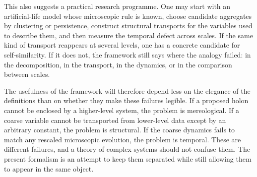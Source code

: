 \documentclass[runningheads]{llncs}
\begin{document}
This also suggests a practical research programme. One may start with an artificial-life model whose microscopic rule is known, choose candidate aggregates by clustering or persistence, construct structural transports for the variables used to describe them, and then measure the temporal defect across scales. If the same kind of transport reappears at several levels, one has a concrete candidate for self-similarity. If it does not, the framework still says where the analogy failed: in the decomposition, in the transport, in the dynamics, or in the comparison between scales.

The usefulness of the framework will therefore depend less on the elegance of the definitions than on whether they make these failures legible. If a proposed holon cannot be enclosed by a higher-level system, the problem is mereological. If a coarse variable cannot be transported from lower-level data except by an arbitrary constant, the problem is structural. If the coarse dynamics fails to match any rescaled microscopic evolution, the problem is temporal. These are different failures, and a theory of complex systems should not confuse them. The present formalism is an attempt to keep them separated while still allowing them to appear in the same object.



\end{document}
